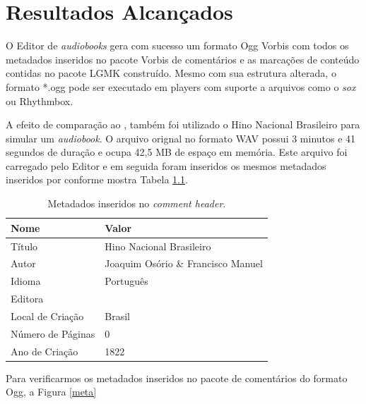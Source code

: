 \chapter[Resultados Alcançados]{Resultados Alcançados}\label{cap6}


O Editor de \textit{audiobooks} gera com sucesso um formato Ogg Vorbis com todos os metadados inseridos no pacote Vorbis de comentários e as marcações de conteúdo contidas no pacote LGMK construído. Mesmo com sua estrutura alterada, o formato *.ogg pode ser executado em players com suporte a arquivos como o \textit{sox} ou Rhythmbox.

A efeito de comparação ao \cite{herbert}, também foi utilizado o Hino Nacional Brasileiro para simular um \textit{audiobook}. O arquivo orignal no formato WAV possui 3 minutos e 41 segundos de duração e ocupa 42,5 MB de espaço em memória. Este arquivo foi carregado pelo Editor e em seguida foram inseridos os mesmos metadados inseridos por \cite{herbert} conforme mostra Tabela \ref{tab1}.

\begin{table}[ht]
\centering
\caption{Metadados inseridos no \textit{comment header}.}
\vspace{0.5cm}
\begin{tabular}{ll}

\hline
\textbf{Nome} & \textbf{Valor} \\
\hline
Título & Hino Nacional Brasileiro \\
Autor & Joaquim Osório \& Francisco Manuel \\
Idioma & Português \\
Editora & \\
Local de Criação & Brasil \\
Número de Páginas & 0 \\
Ano de Criação & 1822 \\
\hline

\end{tabular}
\label{tab1}
\end{table}

Para verificarmos os metadados inseridos no pacote de comentários do formato Ogg, a Figura \ref{meta}

